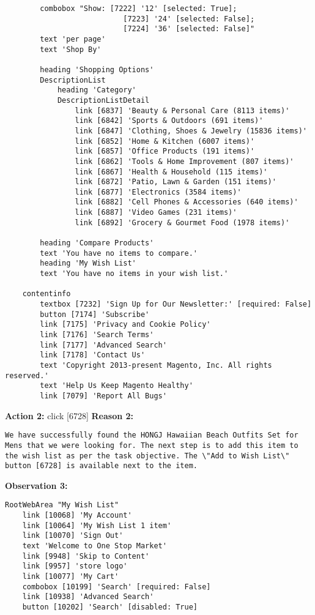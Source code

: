 \begin{tcolorbox}[breakable]
\begin{lstlisting}
        combobox "Show: [7222] '12' [selected: True]; 
                           [7223] '24' [selected: False]; 
                           [7224] '36' [selected: False]"
        text 'per page'
        text 'Shop By'
        
        heading 'Shopping Options'
        DescriptionList
            heading 'Category'
            DescriptionListDetail
                link [6837] 'Beauty & Personal Care (8113 items)'
                link [6842] 'Sports & Outdoors (691 items)'
                link [6847] 'Clothing, Shoes & Jewelry (15836 items)'
                link [6852] 'Home & Kitchen (6007 items)'
                link [6857] 'Office Products (191 items)'
                link [6862] 'Tools & Home Improvement (807 items)'
                link [6867] 'Health & Household (115 items)'
                link [6872] 'Patio, Lawn & Garden (151 items)'
                link [6877] 'Electronics (3584 items)'
                link [6882] 'Cell Phones & Accessories (640 items)'
                link [6887] 'Video Games (231 items)'
                link [6892] 'Grocery & Gourmet Food (1978 items)'

        heading 'Compare Products'
        text 'You have no items to compare.'
        heading 'My Wish List'
        text 'You have no items in your wish list.'

    contentinfo
        textbox [7232] 'Sign Up for Our Newsletter:' [required: False]
        button [7174] 'Subscribe'
        link [7175] 'Privacy and Cookie Policy'
        link [7176] 'Search Terms'
        link [7177] 'Advanced Search'
        link [7178] 'Contact Us'
        text 'Copyright 2013-present Magento, Inc. All rights reserved.'
        text 'Help Us Keep Magento Healthy'
        link [7079] 'Report All Bugs'
\end{lstlisting}
\textbf{Action 2:} click [6728]
\textbf{Reason 2:} 
\begin{lstlisting}
We have successfully found the HONGJ Hawaiian Beach Outfits Set for Mens that we were looking for. The next step is to add this item to the wish list as per the task objective. The \"Add to Wish List\" button [6728] is available next to the item.
\end{lstlisting}





\textbf{Observation 3:} 
\begin{lstlisting}
RootWebArea "My Wish List"
    link [10068] 'My Account'
    link [10064] 'My Wish List 1 item'
    link [10070] 'Sign Out'
    text 'Welcome to One Stop Market'
    link [9948] 'Skip to Content'
    link [9957] 'store logo'
    link [10077] 'My Cart'
    combobox [10199] 'Search' [required: False]
    link [10938] 'Advanced Search'
    button [10202] 'Search' [disabled: True]


\end{lstlisting}
\end{tcolorbox}
